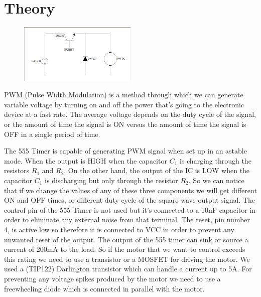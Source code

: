 \documentclass{article}
\begin{document}
\section{Theory}
\begin{figure}
\includegraphics[width=0.5\textwidth]{pic1.png}
\end{figure}
PWM (Pulse Width Modulation) is a method
through which we can generate variable voltage
by turning on and off the power that’s going to
the electronic device at a fast rate. The average
voltage depends on the duty cycle of the signal,
or the amount of time the signal is ON versus
the amount of time the signal is OFF in a single
period of time.\par
The 555 Timer is capable of generating PWM signal when set up in an astable mode. When the output is HIGH when the capacitor $C_1$ is charging through the resistors $R_1$ and $R_2$. On the other hand, the output of the IC is LOW when the capacitor $C_1$ is discharging but only through the resistor $R_2$. So we can notice that if we change the values of any of these three components we will get different ON and OFF times, or different duty cycle of the square wave output signal. The control pin of the 555 Timer is not used but it’s connected to a 10nF capacitor in order to eliminate any external noise from that terminal.
The reset, pin number 4, is active low so therefore it is connected to VCC in order to prevent any unwanted reset of the output. The output of the 555 timer can sink or source a current of 200mA to the load. So if the motor that we want to control exceeds this rating we need to use a transistor or a MOSFET for driving the motor. We used a (TIP122) Darlington transistor which can handle a current up to 5A. For preventing any voltage spikes produced by the motor we need to use a freewheeling diode which is connected in parallel with the motor.
\newpage
\end{document}

